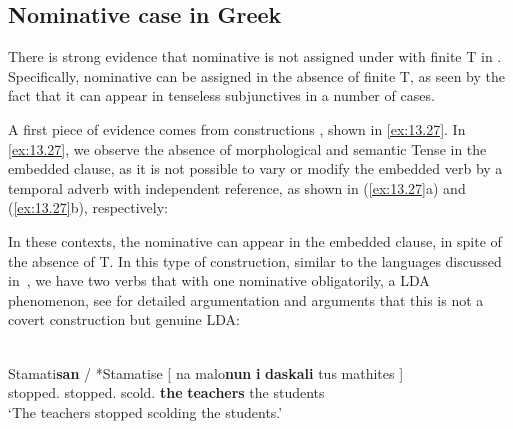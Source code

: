 \documentclass[output=paper]{langsci/langscibook}
\begin{document}
\subsection{Nominative case in Greek}\label{sec:13.3.2}

There is strong evidence that nominative is not assigned under  with
finite T in . Specifically, nominative can be assigned in the absence of
finite T, as seen by the fact that it can appear in tenseless subjunctives in a
number of cases.

A first piece of evidence comes from   constructions
\parencite{AleAna1999}, shown in \eqref{ex:13.27}. In \eqref{ex:13.27},
we observe the absence of morphological and semantic Tense in the embedded
clause, as it is not possible to vary or modify the embedded verb by a temporal
adverb with independent reference, as shown in (\ref{ex:13.27}a) and
(\ref{ex:13.27}b), respectively:

\ea\label{ex:13.27}
    \z
\z

In these contexts, the nominative can appear in the
embedded clause, in spite of the absence of T. In this type of construction,
similar to the languages discussed in~, we have two verbs
that  with one nominative obligatorily, a
\gls{LDA} phenomenon, see \textcite{AleAnaIorMar2012} for detailed
argumentation and arguments that this is not a covert 
construction but genuine \gls{LDA}:

\ea%
\label{ex:13.28} \parencite[(36)]{AleAnaIorMar2012}\\
    \gll  Stamati\textbf{san} / *Stamatise [ na malo\textbf{nun} \textbf{i} \textbf{daskali} tus mathites ] \\
        stopped.\textbf{\Tpl} {}  \hphantom{*}stopped.\Tsg{} {} \Sbjv{} scold.\textbf{\Tpl} \textbf{the} \textbf{teachers}  the students\\
    \glt  ‘The teachers stopped scolding the students.’
\z
\end{document}
